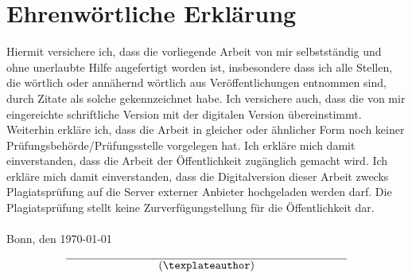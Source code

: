 \newpage
\section*{Ehrenwörtliche Erklärung}
Hiermit versichere ich, dass die vorliegende Arbeit von mir selbstständig und ohne unerlaubte Hilfe angefertigt worden ist, insbesondere dass ich alle Stellen, die wörtlich oder annähernd wörtlich aus Veröffentlichungen entnommen sind, durch Zitate als solche gekennzeichnet habe. Ich versichere auch, dass die von mir eingereichte schriftliche Version mit der digitalen Version übereinstimmt. Weiterhin erkläre ich, dass die Arbeit in gleicher oder ähnlicher Form noch keiner Prüfungsbehörde/Prüfungsstelle vorgelegen hat. Ich erkläre mich damit einverstanden, dass die Arbeit der Öffentlichkeit zugänglich gemacht wird. Ich erkläre mich damit einverstanden, dass die Digitalversion dieser Arbeit zwecks Plagiatsprüfung auf die Server externer Anbieter hochgeladen werden darf. Die Plagiatsprüfung stellt keine Zurverfügungstellung für die Öffentlichkeit dar.
\\
\\
\noindent Bonn, den \today
\begin{flushright}
$$\overline{~~~~~~~~~~~~~~~~~~~~~~~~~\mbox{(\texplateauthor)}~~~~~~~~~~~~~~~~~~~~~~~~~}$$
\end{flushright}


